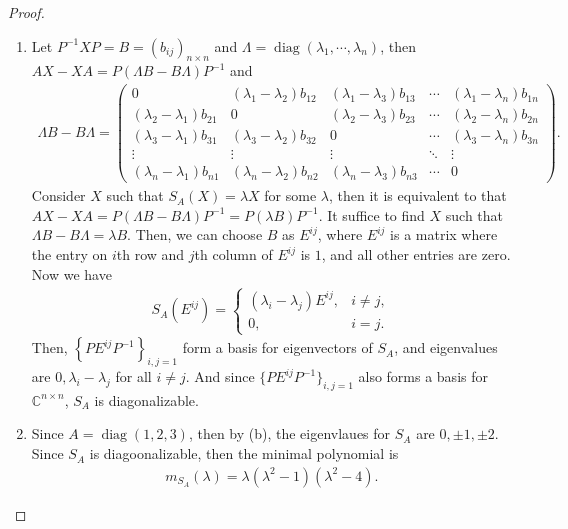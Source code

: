 \documentclass[11pt]{article}
\theoremstyle{definition}
\numberwithin{equation}{subsection}
\begin{document}
\begin{proof}
\begin{enumerate}[label=(\alph*)]
    \item Let $P^{-1} X P = B = \left(b_{ij}\right)_{n \times n}$ and $\Lambda = \operatorname{diag}(\lambda_1, \cdots, \lambda_n)$, then $AX - XA = P (\Lambda B - B \Lambda) P^{-1}$ and 
    \begin{align*}
        \Lambda B - B \Lambda = \begin{pmatrix}
            0 & (\lambda_1 - \lambda_2) b_{12} & (\lambda_1 - \lambda_3) b_{13} & \cdots & (\lambda_1 - \lambda_n) b_{1n} \\
            (\lambda_2 - \lambda_1) b_{21} & 0 & (\lambda_2 - \lambda_3) b_{23} & \cdots & (\lambda_2 - \lambda_n) b_{2n} \\
            (\lambda_3 - \lambda_1) b_{31} & (\lambda_3 - \lambda_2) b_{32} & 0 & \cdots & (\lambda_3 - \lambda_n) b_{3n} \\
            \vdots & \vdots & \vdots & \ddots & \vdots \\
            (\lambda_n - \lambda_1) b_{n1} & (\lambda_n - \lambda_2) b_{n2} & (\lambda_n - \lambda_3) b_{n3} & \cdots & 0
        \end{pmatrix}.
    \end{align*}
    Consider $X$ such that $S_A(X) = \lambda X$ for some $\lambda$, then it is equivalent to that $AX - XA = P (\Lambda B - B \Lambda) P^{-1} = P (\lambda B) P^{-1}$. It suffice to find $X$ such that $\Lambda B - B \Lambda = \lambda B$. Then, we can choose $B$ as $E^{ij}$, where $E^{ij}$ is a matrix where the entry on $i$th row and $j$th column of $E^{ij}$ is $1$, and all other entries are zero. Now we have
    \begin{align*}
        S_A(E^{ij}) = \begin{cases}
            (\lambda_i - \lambda_j) E^{ij}, & i \neq j, \\
            0, & i = j.
        \end{cases}
    \end{align*}
    Then, $\left\{P E^{ij} P^{-1}\right\}_{i,j=1}$ form a basis for eigenvectors of $S_A$, and eigenvalues are $0, \lambda_i - \lambda_j$ for all $i \neq j$. And since $\{P E^{ij} P^{-1}\}_{i,j=1}$ also forms a basis for $\mathbb{C}^{n \times n}$, $S_A$ is diagonalizable.
    
    \item Since $A = \operatorname{diag}(1,2,3)$, then by (b), the eigenvlaues for $S_A$ are $0, \pm 1, \pm 2$. Since $S_A$ is diagoonalizable, then the minimal polynomial is 
    \begin{align*}
        m_{S_A}(\lambda) = \lambda \left(\lambda^2 - 1\right) \left(\lambda^2 - 4\right).
    \end{align*}
\end{enumerate}
\end{proof}
\end{document}
